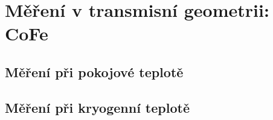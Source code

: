 \section{Měření v transmisní geometrii: CoFe}
\label{chap:vysledky-cofe}

\subsection{Měření při pokojové teplotě}

\subsection{Měření při kryogenní teplotě}
